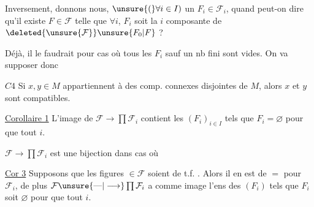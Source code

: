 Inversement, donnons nous,  $\unsure{(}\forall i\in I)$ un $F_i\in\mathcal F_i$, quand peut-on dire qu'il existe $F\in\mathcal F$ telle que $\forall i$, $F_i$ soit la $i$ composante de $\deleted{\unsure{\mathcal F}}\unsure{F_0|F}$ ?

Déjà, il le faudrait pour  cas où tous les $F_i$ sauf un nb fini sont \deleted{$\varnothing$} vides. On va supposer donc

\uline{$C4$} Si $x,y\in M$ appartiennent à des comp. connexes disjointes de $M$, alors $x$ et $y$ sont compatibles.

 

\uline{Corollaire 1} L'image de $\mathcal F\to\prod\mathcal F_i$ contient les $(F_i)_{i\in I}$ tels que $F_i=\varnothing$  pour  que tout $i$.

  $\mathcal F\to\prod\mathcal F_i$ est une bijection dans   cas où  



\uline{Cor 3} Supposons que les figures  $\in\mathcal F$ soient de t.f.  . Alors il en est de $=$  pour $\mathcal F_i$, de plus $\mathcal F\unsure{\text{---}|\longrightarrow}\prod\mathcal F_i$ a comme image l'ens des $(F_i)$ tels que $F_i$ soit $\varnothing$ pour  que tout $i$.
